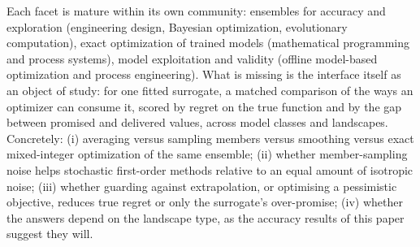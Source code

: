 Each facet is mature within its own community: ensembles for accuracy and exploration (engineering design, Bayesian
optimization, evolutionary computation), exact optimization of trained models (mathematical programming and process
systems), model exploitation and validity (offline model-based optimization and process engineering). What is missing
is the interface itself as an object of study: for one fitted surrogate, a matched comparison of the ways an
optimizer can consume it, scored by regret on the true function and by the gap between promised and delivered values,
across model classes and landscapes. Concretely: (i) averaging versus sampling members versus smoothing versus exact
mixed-integer optimization of the same ensemble; (ii) whether member-sampling noise helps stochastic first-order
methods relative to an equal amount of isotropic noise; (iii) whether guarding against extrapolation, or optimising a
pessimistic objective, reduces true regret or only the surrogate's over-promise; (iv) whether the answers depend on
the landscape type, as the accuracy results of this paper suggest they will.

